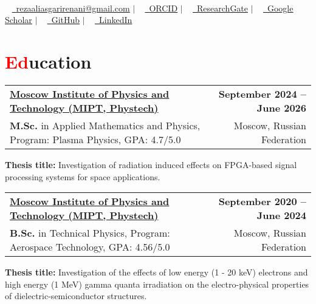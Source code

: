 \documentclass[a4paper,11pt]{article}
\makeatletter
\newcommand{\resumeItem}[1]{
    \item\small{
        {#1 \vspace{-2pt}}
    }
}
\newcommand{\resumeSubheading}[4]{
    \vspace{-2pt}\item
    \begin{tabular*}{1.0\textwidth}[t]{l@{\extracolsep{\fill}}r}
        \textbf{#1} & \textbf{\small #2} \\
        \small#3 & \small #4
    \end{tabular*}\vspace{-7pt}
}
\newcommand{\resumeSubHeadingListStart}{\begin{itemize}[leftmargin=0.0in, label={}]}
\newcommand{\resumeSubHeadingListEnd}{\end{itemize}}
\makeatother
\begin{document}
\begin{center}
    {\Huge \scshape {\fontsize{25}{30}\selectfont{Reza}} {\fontsize{25}{30}}} \\ \vspace{3pt}
    \small ~ 
    \href{mailto:rezaaliasgarirenani@gmail.com}{\raisebox{-0.2\height}\faEnvelope\ \underline{rezaaliasgarirenani@gmail.com}} $|$ ~
    \href{https://orcid.org/0009-0000-8983-755X}{\raisebox{-0.2\height}\faOrcid\ \underline{ORCID}} $|$ ~
    \href{https://www.researchgate.net/profile/Reza-Aliasgari-Renani}{\raisebox{-0.2\height}\faResearchgate\
    \underline{ResearchGate}} $|$ ~
    \href{https://scholar.google.com/citations?user=L9Vv3C8AAAAJ&hl=en}{\raisebox{-0.2\height}\faGraduationCap\ \underline{Google Scholar}} $|$ ~
    \href{https://github.com/rezaaliasgarirenani}{\raisebox{-0.2\height}\faGithub\ \underline{GitHub}} $|$ ~
    \href{https://linkedin.com/in/reza-aliasgari-renani}{\raisebox{-0.2\height}\faLinkedin\ \underline{LinkedIn}}
    \vspace{-10pt}
\end{center}

\section{\textcolor{red}{Ed}ucation}
\resumeSubHeadingListStart
    \resumeSubheading
        {\href{https://mipt.ru/}{Moscow Institute of Physics and Technology (MIPT, Phystech)}}{September 2024 -- June 2026}
        {\textbf{M.Sc.} in Applied Mathematics and Physics, Program: Plasma Physics, GPA: 4.7/5.0}{Moscow, Russian Federation}
        {\resumeItem{\textbf{Thesis title:} Investigation of radiation induced effects on FPGA-based signal processing systems for space applications.}}
    \resumeSubheading
        {\href{https://mipt.ru/}{Moscow Institute of Physics and Technology (MIPT, Phystech)}}{September 2020 -- June 2024}
        {\textbf{B.Sc.} in Technical Physics, Program: Aerospace Technology, GPA: 4.56/5.0}{Moscow, Russian Federation}
        {\resumeItem{\textbf{Thesis title:} Investigation of the effects of low energy (1 - 20 keV) electrons and high energy (1 MeV) gamma quanta irradiation on the electro-physical properties of dielectric-semiconductor structures.}}
\resumeSubHeadingListEnd
\vspace{-15pt}

\end{document}
